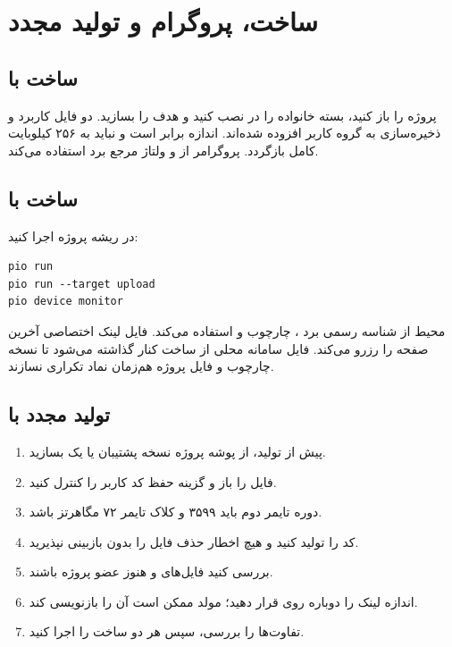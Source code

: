 \chapter{ساخت، پروگرام و تولید مجدد}

\section{ساخت با }
پروژه
را باز کنید، بسته خانواده
را در  نصب کنید و هدف را بسازید. دو فایل کاربرد و ذخیره‌سازی به گروه کاربر افزوده شده‌اند. اندازه
برابر
است و نباید به ۲۵۶ کیلوبایت کامل بازگردد. پروگرامر
از
و ولتاژ مرجع برد استفاده می‌کند.

\section{ساخت با }
در ریشه پروژه اجرا کنید:
\begin{LTR}
\begin{verbatim}
pio run
pio run --target upload
pio device monitor
\end{verbatim}
\end{LTR}
محیط
از شناسه رسمی برد
، چارچوب  و  استفاده می‌کند. فایل لینک اختصاصی آخرین صفحه  را رزرو می‌کند. فایل سامانه محلی از ساخت  کنار گذاشته می‌شود تا نسخه چارچوب و فایل پروژه هم‌زمان نماد تکراری نسازند.

\section{تولید مجدد با }
\begin{enumerate}
  \item پیش از تولید، از پوشه پروژه نسخه پشتیبان یا یک  بسازید.
  \item فایل
را باز و گزینه حفظ کد کاربر را کنترل کنید.
  \item دوره تایمر دوم باید ۳۵۹۹ و کلاک تایمر ۷۲ مگاهرتز باشد.
  \item کد  را تولید کنید و هیچ اخطار حذف فایل را بدون بازبینی نپذیرید.
  \item بررسی کنید فایل‌های
و
هنوز عضو پروژه  باشند.
  \item اندازه  لینک  را دوباره روی
قرار دهید؛ مولد ممکن است آن را بازنویسی کند.
  \item تفاوت‌ها را بررسی، سپس هر دو ساخت را اجرا کنید.
\end{enumerate}

